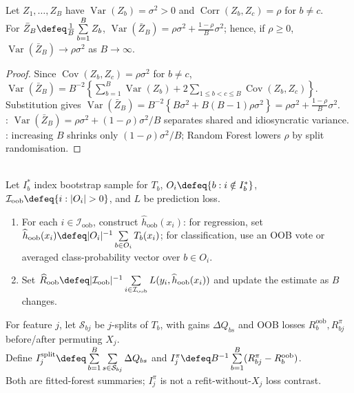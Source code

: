 \begin{theorem} \label{thm:sl-correlated-ensemble-variance} \\
Let $Z_1,\ldots,Z_B$ have $\operatorname{Var}(Z_b)=\sigma^2>0$ and $\operatorname{Corr}(Z_b,Z_c)=\rho$ for $b\neq c$.\\
For $\bar{Z}_B\defeq \frac{1}{B}\sum\limits_{b=1}^B Z_b$, $\operatorname{Var}(\bar{Z}_B)=\rho\sigma^2+\frac{1-\rho}{B}\sigma^2$; hence, if $\rho\geq0$, $\operatorname{Var}(\bar{Z}_B)\to\rho\sigma^2$ as $B\to\infty$.
\begin{proof}
Since $\operatorname{Cov}(Z_b,Z_c)=\rho\sigma^2$ for $b\neq c$, $\operatorname{Var}(\bar{Z}_B)=B^{-2}\left\{\sum\limits_{b=1}^B\operatorname{Var}(Z_b)+2\sum\limits_{1\leq b<c\leq B}\operatorname{Cov}(Z_b,Z_c)\right\}$.\\
Substitution gives $\operatorname{Var}(\bar{Z}_B)=B^{-2}\left\{B\sigma^2+B(B-1)\rho\sigma^2\right\}=\rho\sigma^2+\frac{1-\rho}{B}\sigma^2$.\\
: $\operatorname{Var}(\bar{Z}_B)=\rho\sigma^2+(1-\rho)\sigma^2/B$ separates shared and idiosyncratic variance.\\
: increasing $B$ shrinks only $(1-\rho)\sigma^2/B$; Random Forest lowers $\rho$ by split randomisation.
\end{proof}
\end{theorem}

\begin{method} \label{meth:sl-random-forest-oob-and-importance} \\
Let $I_b^*$ index bootstrap sample for $T_b$, $O_i\defeq\{b:i\notin I_b^*\}$, $\mathcal{I}_{\mathrm{oob}}\defeq\{i:|O_i|>0\}$, and $L$ be prediction loss.
\begin{enumerate}[label=(\roman*)]
\setlength{\itemsep}{0pt}
\item For each $i\in\mathcal{I}_{\mathrm{oob}}$, construct $\widehat{h}_{\mathrm{oob}}(x_i)$: for regression, set $\widehat{h}_{\mathrm{oob}}(x_i)\defeq |O_i|^{-1}\sum\limits_{b\in O_i}T_b(x_i)$; for classification, use an OOB vote or averaged class-probability vector over $b\in O_i$.
\item Set $\widehat{R}_{\mathrm{oob}}\defeq |\mathcal{I}_{\mathrm{oob}}|^{-1}\sum\limits_{i\in\mathcal{I}_{\mathrm{oob}}}L(y_i,\widehat{h}_{\mathrm{oob}}(x_i))$ and update the estimate as $B$ changes.
\end{enumerate}
For feature $j$, let $\mathcal{S}_{bj}$ be $j$-splits of $T_b$, with gains $\Delta Q_{bs}$ and OOB losses $R_b^{\mathrm{oob}},R_{bj}^{\pi}$ before/after permuting $X_j$.\\
Define $I_j^{\mathrm{split}}\defeq\sum\limits_{b=1}^B\sum\limits_{s\in\mathcal{S}_{bj}}\Delta Q_{bs}$ and $I_j^{\pi}\defeq B^{-1}\sum\limits_{b=1}^B(R_{bj}^{\pi}-R_b^{\mathrm{oob}})$.\\
Both are fitted-forest summaries; $I_j^{\pi}$ is not a refit-without-$X_j$ loss contrast.
\end{method}

